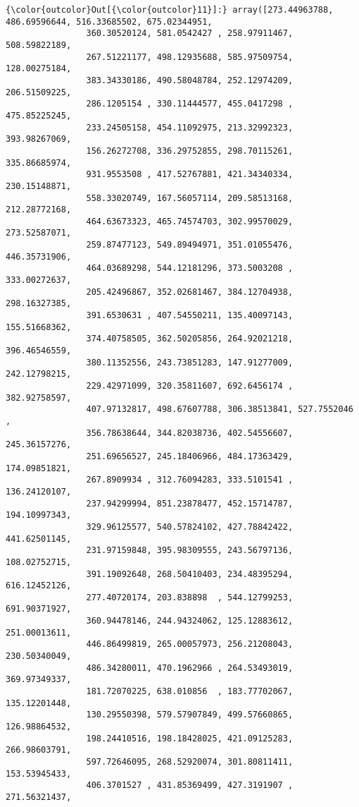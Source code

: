 \documentclass[11pt]{article}
\begin{document}
\begin{Verbatim}[commandchars=\\\{\}]
{\color{outcolor}Out[{\color{outcolor}11}]:} array([273.44963788, 486.69596644, 516.33685502, 675.02344951,
                360.30520124, 581.0542427 , 258.97911467, 508.59822189,
                267.51221177, 498.12935688, 585.97509754, 128.00275184,
                383.34330186, 490.58048784, 252.12974209, 206.51509225,
                286.1205154 , 330.11444577, 455.0417298 , 475.85225245,
                233.24505158, 454.11092975, 213.32992323, 393.98267069,
                156.26272708, 336.29752855, 298.70115261, 335.86685974,
                931.9553508 , 417.52767881, 421.34340334, 230.15148871,
                558.33020749, 167.56057114, 209.58513168, 212.28772168,
                464.63673323, 465.74574703, 302.99570029, 273.52587071,
                259.87477123, 549.89494971, 351.01055476, 446.35731906,
                464.03689298, 544.12181296, 373.5003208 , 333.00272637,
                205.42496867, 352.02681467, 384.12704938, 298.16327385,
                391.6530631 , 407.54550211, 135.40097143, 155.51668362,
                374.40758505, 362.50205856, 264.92021218, 396.46546559,
                380.11352556, 243.73851283, 147.91277009, 242.12798215,
                229.42971099, 320.35811607, 692.6456174 , 382.92758597,
                407.97132817, 498.67607788, 306.38513841, 527.7552046 ,
                356.78638644, 344.82038736, 402.54556607, 245.36157276,
                251.69656527, 245.18406966, 484.17363429, 174.09851821,
                267.8909934 , 312.76094283, 333.5101541 , 136.24120107,
                237.94299994, 851.23878477, 452.15714787, 194.10997343,
                329.96125577, 540.57824102, 427.78842422, 441.62501145,
                231.97159848, 395.98309555, 243.56797136, 108.02752715,
                391.19092648, 268.50410403, 234.48395294, 616.12452126,
                277.40720174, 203.838898  , 544.12799253, 691.90371927,
                360.94478146, 244.94324062, 125.12883612, 251.00013611,
                446.86499819, 265.00057973, 256.21208043, 230.50340049,
                486.34280011, 470.1962966 , 264.53493019, 369.97349337,
                181.72070225, 638.010856  , 183.77702067, 135.12201448,
                130.29550398, 579.57907849, 499.57660865, 126.98864532,
                198.24410516, 198.18428025, 421.09125283, 266.98603791,
                597.72646095, 268.52920074, 301.80811411, 153.53945433,
                406.3701527 , 431.85369499, 427.3191907 , 271.56321437,

\end{Verbatim}
\end{document}
